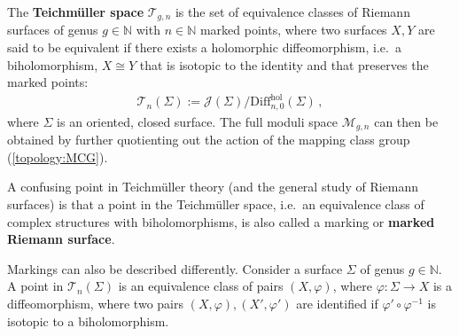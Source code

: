    \begin{construct}
        The \textbf{Teichm\"uller space} $\mathcal{T}_{g,n}$ is the set of equivalence classes of Riemann surfaces of genus $g\in\mathbb{N}$ with $n\in\mathbb{N}$ marked points, where two surfaces $X,Y$ are said to be equivalent if there exists a holomorphic diffeomorphism, i.e.~a biholomorphism, $X\cong Y$ that is isotopic to the identity and that preserves the marked points:
        \begin{gather}
            \mathcal{T}_n(\Sigma) := \mathcal{J}(\Sigma)/\mathrm{Diff}^{\text{hol}}_{n,0}(\Sigma)\,,
        \end{gather}
        where $\Sigma$ is an oriented, closed surface. The  full moduli space $\mathcal{M}_{g,n}$ can then be obtained by further quotienting out the action of the mapping class group (\cref{topology:MCG}).
    \end{construct}
    \begin{remark}[Markings]
        A confusing point in Teichm\"uller theory (and the general study of Riemann surfaces) is that a point in the Teichm\"uller space, i.e.~an equivalence class of complex structures with biholomorphisms, is also called a marking or \textbf{marked Riemann surface}.
    \end{remark}
    \begin{property}
        Markings can also be described differently. Consider a surface $\Sigma$ of genus $g\in\mathbb{N}$. A point in $\mathcal{T}_n(\Sigma)$ is an equivalence class of pairs $(X,\varphi)$, where $\varphi:\Sigma\rightarrow X$ is a diffeomorphism, where two pairs $(X,\varphi),(X',\varphi')$ are identified if $\varphi'\circ\varphi^{-1}$ is isotopic to a biholomorphism.
    \end{property}

